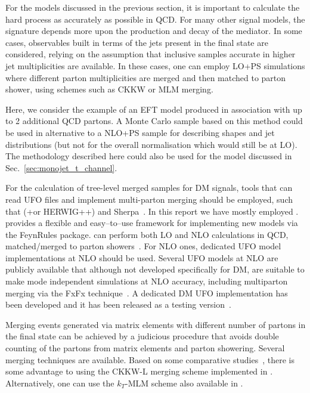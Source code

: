 For the models discussed in the previous section, it is important
to calculate the hard process as accurately as possible in QCD.
For many other signal models, the \MET{} signature depends more
upon the production and decay of the mediator. In some cases, observables
built in terms of the jets present in the final state are considered, relying on the assumption that inclusive samples accurate in higher jet multiplicities are available.  In these cases, one can employ LO+PS simulations where different parton multiplicities are merged and then matched to parton shower, using schemes such as CKKW or MLM merging.

Here, we consider the example of an EFT model produced in association
with up to 2 additional QCD partons.   A Monte Carlo sample based on
this method could be used in alternative to a NLO+PS sample for describing shapes 
and jet distributions (but not for the overall normalisation which would still be at LO).
The methodology described here could also be used for the \tchannel model
discussed in Sec.~\ref{sec:monojet_t_channel}.

For the calculation of tree-level merged samples for DM signals, tools that can  
read UFO files and implement multi-parton merging should be employed, such 
that \madgraph (+\pythiaEight or {\sc HERWIG++}) and {\sc Sherpa}~\cite{Hoche:2014kca}.
In this report we have mostly employed \madgraph. 
\madgraph provides a flexible and easy--to--use framework for implementing
new models via the {\sc FeynRules} package.
\madgraph can perform both LO and NLO calculations in QCD, matched/merged to parton showers~\cite{Alwall:2008qv}. For NLO ones, dedicated UFO model implementations at NLO should be used. Several UFO models at NLO are publicly available that although not developed specifically for DM, are suitable to make mode independent simulations at NLO accuracy, including multiparton merging 
via the FxFx technique~\cite{Frederix:2012ps}. A dedicated DM UFO implementation 
has been developed and it has been released as a testing version~\cite{NewMadgraphModels}.

Merging events generated via matrix elements with different number of partons in the final state can be achieved by a judicious procedure that  avoids double counting of the partons from matrix elements and parton showering.
Several merging techniques are available. Based on some comparative studies \,\cite{Alwall:0706.2569}, there is some advantage to using the CKKW-L merging scheme \cite{Lonnblad:2011xx} implemented in \pythiaEight.  Alternatively, one can use the $k_T$-MLM scheme also available in \pythiaEight.

